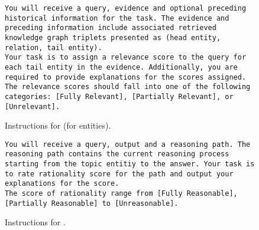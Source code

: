 \begin{figure*}[htbp]
\begin{tcolorbox}[left=1mm,right=1mm,top=0.mm, bottom=0mm,colback=white]
\begin{lstlisting}
You will receive a query, evidence and optional preceding historical information for the task. The evidence and preceding information include associated retrieved knowledge graph triplets presented as (head entity, relation, tail entity). 
Your task is to assign a relevance score to the query for each tail entity in the evidence. Additionally, you are required to provide explanations for the scores assigned.
The relevance scores should fall into one of the following categories: [Fully Relevant], [Partially Relevant], or [Unrelevant]. 
\end{lstlisting}
\end{tcolorbox}
\caption{Instructions for \crel (for entities).}
\label{fig:pro-erel}
\end{figure*}

\begin{figure*}[htbp]
\begin{tcolorbox}[left=1mm,right=1mm,top=0.mm, bottom=0mm,colback=white]
\begin{lstlisting}
You will receive a query, output and a reasoning path. The reasoning path contains the current reasoning process starting from the topic entitiy to the answer. Your task is to rate rationality score for the path and output your explanations for the score.
The score of rationality range from [Fully Reasonable], [Partially Reasonable] to [Unreasonable].
\end{lstlisting}
\end{tcolorbox}
\caption{Instructions for \cre.}
\label{fig:pro-reason}
\end{figure*}

